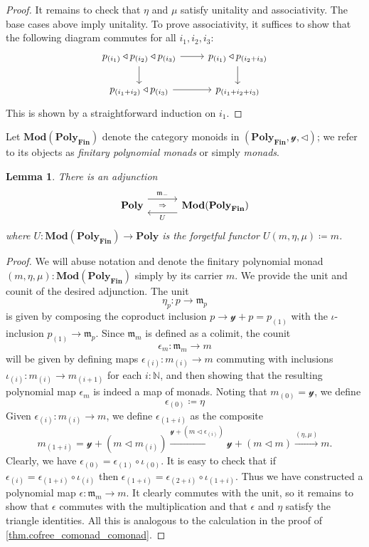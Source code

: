 \documentclass[11pt, one side, article]{memoir}
\newcommand{\adj}[5][30pt]{%
\begin{tikzcd}[ampersand replacement=\&, column sep=#1]
  #2\ar[r, shift left=7pt, "#3"]
  \ar[r, phantom, "\scriptstyle\Rightarrow"]\&
  #5\ar[l, shift left=7pt, "#4"]
\end{tikzcd}
}
\theoremstyle{definition}
\theoremstyle{plain}
\newtheorem{lemma}[definitionx]{Lemma}
\newcommand{\Cat}[1]{\mathbf{#1}}%
\newcommand{\To}[2][]{\xrightarrow[#1]{#2}}
\newcommand{\nn}{\mathbb{N}}
\newcommand{\finset}{\Cat{Fin}}
\newcommand{\polyfin}{\poly_{\finset}}
\newcommand{\Mod}{\Cat{Mod}}
\newcommand{\yon}{\mathcal{y}}
\newcommand{\poly}{\Cat{Poly}}
\newcommand{\tri}{\mathbin{\triangleleft}}
\newcommand{\free}{\mathfrak{m}}
\newcommand{\hoc}[1]{_{(#1)}}
\begin{document}
\begin{proof}
It remains to check that $\eta$ and $\mu$ satisfy unitality and associativity. The base cases above imply unitality. To prove associativity, it suffices to show that the following diagram commutes for all $i_1,i_2,i_3$:
\[
\begin{tikzcd}
	p\hoc{i_1}\tri p\hoc{i_2}\tri p\hoc{i_3}\ar[r]\ar[d]&
	p\hoc{i_1}\tri p\hoc{i_2+i_3}\ar[d]\\
	p\hoc{i_1+i_2}\tri p\hoc{i_3}\ar[r]&
	p\hoc{i_1+i_2+i_3}
\end{tikzcd}
\]
This is shown by a straightforward induction on $i_1$.
\end{proof}

Let $\Mod(\polyfin)$ denote the category monoids in $(\polyfin,\yon,\tri)$; we refer to its objects as \emph{finitary polynomial monads} or simply \emph{monads}.

\begin{lemma}
There is an adjunction
\[
\adj{\poly}{\free_-}{U}{\Mod(\polyfin)}
\]
where $U\colon\Mod(\polyfin)\to\poly$ is the forgetful functor $U(m,\eta,\mu)\coloneqq m$.
\end{lemma}
\begin{proof}
We will abuse notation and denote the finitary polynomial monad $(m,\eta,\mu):\Mod(\polyfin)$ simply by its carrier $m$. We provide the unit and counit of the desired adjunction. The unit
\[
\eta_p\colon p\to\free_p
\]
is given by composing the coproduct inclusion $p\to\yon+p=p\hoc{1}$ with the $\iota$-inclusion $p\hoc{1}\to\free_{p}$. Since $\free_m$ is defined as a colimit, the counit
\[\epsilon_m\colon\free_m\to m\]
will be given by defining maps $\epsilon\hoc{i}\colon m\hoc{i}\to m$ commuting with inclusions $\iota\hoc{i}\colon m\hoc{i}\to m\hoc{i+1}$ for each $i:\nn$, and then showing that the resulting polynomial map $\epsilon_m$ is indeed a map of monads. Noting that $m\hoc{0}=\yon$, we define
\[
\epsilon\hoc{0}\coloneqq\eta
\]
Given $\epsilon\hoc{i}\colon m\hoc{i}\to m$, we define $\epsilon\hoc{1+i}$ as the composite
\[
	m\hoc{1+i}=
  \yon+\left(m\tri m\hoc{i}\right)\To{\yon+(m\tri\epsilon\hoc{i})}
	\yon+(m\tri m)\To{(\eta,\mu)}
	m.
\]
Clearly, we have $\epsilon\hoc{0}=\epsilon\hoc{1}\circ\iota\hoc{0}$. It is easy to check that if $\epsilon\hoc{i}=\epsilon\hoc{1+i}\circ\iota\hoc{i}$ then $\epsilon\hoc{1+i}=\epsilon\hoc{2+i}\circ\iota\hoc{1+i}$. Thus we have constructed a polynomial map $\epsilon\colon \free_m\to m$. It clearly commutes with the unit, so it remains to show that $\epsilon$ commutes with the multiplication and that $\epsilon$ and $\eta$ satisfy the triangle identities. All this is analogous to the calculation in the proof of \cref{thm.cofree_comonad_comonad}.
\end{proof}
\end{document}
